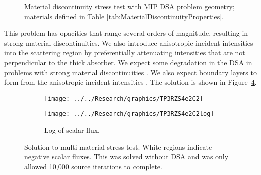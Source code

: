 \documentclass[12pt]{article}
\begin{document}
\begin{figure}[!hp]
\centering
{}
\caption{Material discontinuity stress test with MIP DSA problem geometry; materials defined in Table \ref{tab:MaterialDiscontinuityProperties}.}
\label{fig:MaterialDiscontinuityMesh}
\end{figure}

This problem has opacities that range several orders of magnitude, resulting in strong material discontinuities. We also introduce anisotropic incident intensities into the scattering region by preferentially attenuating intensities that are not perpendicular to the thick absorber. We expect some degradation in the DSA in problems with strong material discontinuities \cite{WangDissertation}. We also expect boundary layers to form from the anisotropic incident intensities \cite{AdamsDFEMDiffLimit}. The solution is shown in Figure~\ref{fig:RZMultiMaterial}. 

\begin{figure}[!htb]
\centering
\begin{subfigure}{0.8\textwidth}
\centering
\texttt{[image: ../../Research/graphics/TP3RZS4e2C2]}
\label{fig:TP2RZS4e4C2}
\end{subfigure}
\begin{subfigure}{0.8\textwidth}
\centering
\texttt{[image: ../../Research/graphics/TP3RZS4e2C2log]}
\caption{Log of scalar flux.}
\label{fig:TP2RZS4e4C2}
\end{subfigure}
\caption{Solution to multi-material stress test. White regions indicate negative scalar fluxes. {\color{red}This was solved without DSA and was only allowed 10,000 source iterations to complete.}}
\label{fig:RZMultiMaterial}
\end{figure}
\end{document}
